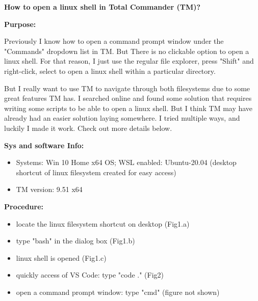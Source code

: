 \documentclass{article}
\begin{document}
\textbf{\Large How to open a linux shell in Total Commander (TM)?}
\vspace{0.5cm}
\begin{flushleft}
	\textbf{\normalsize  Purpose:}
\end{flushleft}

\begin{flushleft}
	Previously I know how to open a command prompt window under the "Commands" dropdown list in TM. But There is no clickable option to open a linux shell. For that reason, I just use the regular file explorer, press "Shift" and right-click, select to open a linux shell within a particular directory. 
\end{flushleft}

\begin{flushleft}	
	But I really want to use TM to navigate through both filesystems due to some great features TM has. I searched online and found some solution that requires writing some scripts to be able to open a linux shell. But I think TM may have already had an easier solution laying somewhere. I tried multiple ways, and luckily I made it work. Check out more details below.
\end{flushleft}

\begin{flushleft}
	\textbf{\normalsize  Sys and software Info:}
	\begin{itemize}
		\item  \normalsize Systems: Win 10 Home x64 OS; WSL enabled: Ubuntu-20.04 (\small desktop shortcut of linux filesystem created for easy access)
  		\item  \normalsize TM version: 9.51 x64	
	\end{itemize}	
\end{flushleft}

\begin{flushleft}
	\textbf{Procedure:}
\end{flushleft}

\begin{flushleft}
	\begin{itemize}
		\item locate the linux filesystem shortcut on desktop (Fig1.a)
  		\item type "bash" in the dialog box (Fig1.b)
    	\item linux shell is opened (Fig1.c)
     	\item quickly access of VS Code: type "code ." (Fig2)
      	\item  open a command prompt window: type "cmd" (figure not shown)
	\end{itemize}
\end{flushleft}
\end{document}
